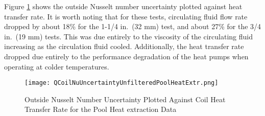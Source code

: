 Figure \ref{fig:ExpResult:Uncertainty:PoolHeatExtr:QCoilNuUncertaintyUnfilteredPoolHeatExtr} shows the outside Nusselt number uncertainty plotted against heat transfer rate. It is worth noting that for these tests, circulating fluid flow rate dropped by about 18\% for the 1-1/4 in.\ (32 mm) test, and about 27\% for the 3/4 in.\ (19 mm) tests. This was due entirely to the viscosity of the circulating fluid increasing as the circulation fluid cooled. Additionally, the heat transfer rate dropped due entirely to the performance degradation of the heat pumps when operating at colder temperatures.

\begin{figure}
	\centering
	\texttt{[image: QCoilNuUncertaintyUnfilteredPoolHeatExtr.png]}
	\caption{Outside Nusselt Number Uncertainty Plotted Against Coil Heat Transfer Rate for the Pool Heat extraction Data}	\label{fig:ExpResult:Uncertainty:PoolHeatExtr:QCoilNuUncertaintyUnfilteredPoolHeatExtr}
\end{figure}
